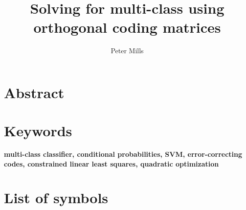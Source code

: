 \documentclass{article}
\title{Solving for multi-class using orthogonal coding matrices}
\author{Peter Mills}
\begin{document}
\maketitle

\section*{Abstract}



\section*{Keywords}
\textbf{multi-class classifier, 
	conditional probabilities,
	SVM,
	error-correcting codes,
	constrained linear least squares,
	quadratic optimization}

\tableofcontents

\section*{List of symbols}





\newpage
{}

\end{document}
